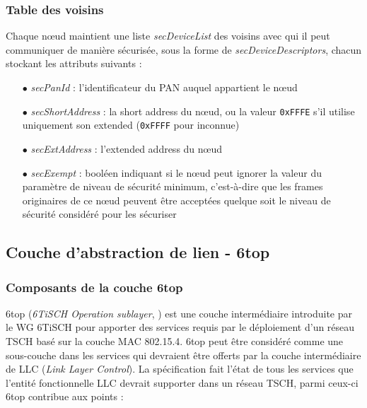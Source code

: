 \documentclass[]{report}
\begin{document}
\subsubsection{Table des voisins}

Chaque nœud maintient une liste \textit{secDeviceList} des voisins avec qui il peut communiquer de manière sécurisée, sous la forme de \textit{secDeviceDescriptors}, chacun stockant les attributs suivants :
\vspace{0.2cm}
\begin{itemize}
\item[$\bullet$] \textit{secPanId} : l'identificateur du PAN auquel appartient le nœud
\vspace{0.1cm}
\item[$\bullet$] \textit{secShortAddress} : la short address du nœud, ou la valeur \texttt{0xFFFE} s'il utilise uniquement son extended (\texttt{0xFFFF} pour inconnue)
\vspace{0.1cm}
\item[$\bullet$] \textit{secExtAddress} : l'extended address du nœud
\vspace{0.1cm}
\item[$\bullet$] \textit{secExempt} : booléen indiquant si le nœud peut ignorer la valeur du paramètre de niveau de sécurité minimum, c'est-à-dire que les frames originaires de ce nœud peuvent être acceptées quelque soit le niveau de sécurité considéré pour les sécuriser
\vspace{0.1cm}

\end{itemize}

\newpage

	\subsection{Couche d'abstraction de lien - 6top}
	\label{6top}

\subsubsection{Composants de la couche 6top}

\par 6top (\textit{6TiSCH Operation sublayer}, \cite{rfc8480}) est une couche intermédiaire introduite par le WG 6TiSCH pour apporter des services requis par le déploiement d'un réseau TSCH basé sur la couche MAC 802.15.4. 6top peut être considéré comme une sous-couche dans les services qui devraient être offerts par la couche intermédiaire de LLC (\textit{Link Layer Control}). La spécification \cite{rfc7554} fait l'état de tous les services que l'entité fonctionnelle LLC devrait supporter dans un réseau TSCH, parmi ceux-ci 6top contribue aux points :
\end{document}
